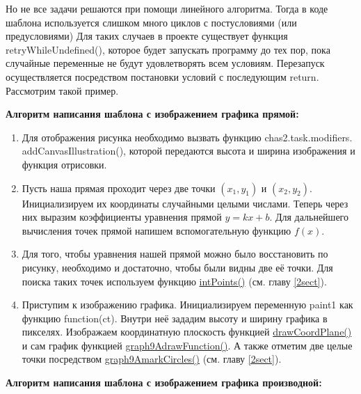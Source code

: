 Но не все задачи решаются при помощи линейного алгоритма. Тогда в коде шаблона
используется слишком много циклов с постусловиями (или предусловиями)
Для таких случаев в проекте существует функция retryWhileUndefined(), которое
будет запускать программу до тех пор, пока случайные переменные не будут удовлетворять всем условиям.
Перезапуск осуществляется посредством постановки условий с последующим return.
Рассмотрим такой пример.

\textbf{Алгоритм написания шаблона с изображением графика прямой:}
\begin{enumerate}
	\item Для отображения рисунка необходимо вызвать функцию chas2.task.modifiers.
	      addCanvasIllustration(), которой передаются высота и ширина изображения и функция отрисовки.
	      
	\item Пусть наша прямая проходит через две точки $(x_1,y_1)$ и $(x_2,y_2)$. Инициализируем их координаты случайными целыми числами. Теперь через них выразим коэффициенты уравнения прямой $y=kx+b$.
	      Для дальнейшего вычисления точек прямой напишем вспомогательную функцию $f(x)$.
	      

	\item Для того, чтобы уравнения нашей прямой можно было восстановить по рисунку, необходимо и достаточно,
	      чтобы были видны две её точки. Для поиска таких точек используем функцию \hyperlink{intPoints}{intPoints()} (см. главу \ref{2sect}).
	      
	\item Приступим к изображению графика. Инициализируем переменную paint1 как функцию function(ct). Внутри неё зададим высоту и ширину графика в пикселях.
	      Изображаем координатную плоскость функцией \hyperlink{drawCoordPlane}{drawCoordPlane()} и сам график функцией
	      \hyperlink{graph9AdrawFunction}{graph9AdrawFunction()}. А также отметим две целые точки посредством \hyperlink{graph9AmarkCircles}{graph9AmarkCircles()} (см. главу \ref{2sect}).
	      \vspace{\baselineskip}

	      
\end{enumerate}

\textbf{Алгоритм написания шаблона с изображением графика производной:}


